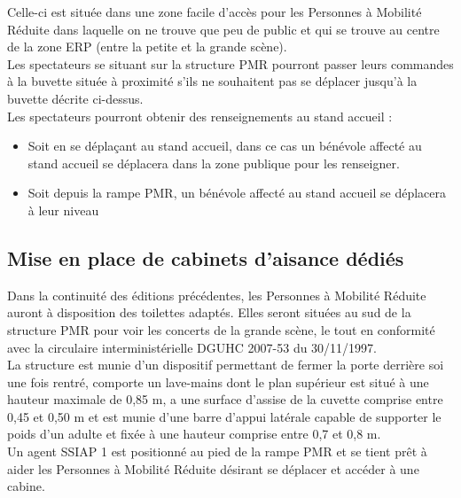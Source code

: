 \documentclass[hidelinks, paper=a4, fontsize=13pt]{report}
\begin{document}
Celle-ci est située dans une zone facile d’accès pour les Personnes à Mobilité Réduite dans laquelle on ne trouve que peu de public et qui se trouve au centre de la zone ERP (entre la petite et la grande scène).\\

Les spectateurs se situant sur la structure PMR pourront passer leurs commandes à la buvette située à proximité s’ils ne souhaitent pas se déplacer jusqu’à la buvette décrite ci-dessus. \\

Les spectateurs pourront obtenir des renseignements au stand accueil :
\begin{itemize}
\item Soit en se déplaçant au stand accueil, dans ce cas un bénévole affecté au stand accueil se déplacera dans la zone publique pour les renseigner.
\item Soit depuis la rampe PMR, un bénévole affecté au stand accueil se déplacera à leur niveau
\end{itemize}

\subsection{Mise en place de cabinets d’aisance dédiés}
\label{toilette_PMR}

Dans la continuité des éditions précédentes, les Personnes à Mobilité Réduite auront à disposition des toilettes adaptés. Elles seront situées au sud de la structure PMR pour voir les concerts de la grande scène, le tout en conformité avec la circulaire interministérielle DGUHC 2007-53 du 30/11/1997.\\

La structure est munie d’un dispositif permettant de fermer la porte derrière soi une fois rentré, comporte un lave-mains dont le plan supérieur est situé à une hauteur maximale de 0,85 m, a une surface d’assise de la cuvette comprise entre 0,45 et 0,50 m et est munie d’une barre d’appui latérale capable de supporter le poids d’un adulte et fixée à une hauteur comprise entre 0,7 et 0,8 m.\\

Un agent SSIAP 1 est positionné au pied de la rampe PMR et se tient prêt à aider les Personnes à Mobilité Réduite désirant se déplacer et accéder à une cabine.
\end{document}

